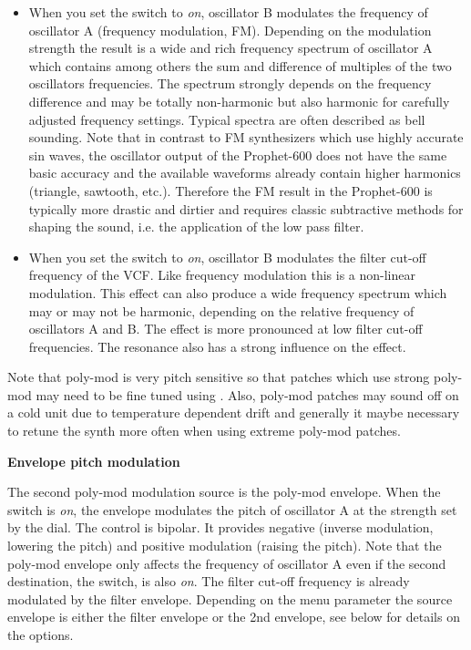 \begin{itemize}
  \item When you set the \polymodfreq switch to \textit{on}, oscillator B modulates the frequency of oscillator A (frequency modulation, FM). Depending on the modulation strength the result is a wide and rich frequency spectrum of oscillator A which contains among others the sum and difference of multiples of the two oscillators frequencies. The spectrum strongly depends on the frequency difference and may be totally non-harmonic but also harmonic for carefully adjusted frequency settings. Typical spectra are often described as bell sounding. Note that in contrast to FM synthesizers which use highly accurate sin waves, the oscillator output of the Prophet-600 does not have the same basic accuracy and the available waveforms already contain higher harmonics (triangle, sawtooth, etc.). Therefore the FM result in the Prophet-600 is typically more drastic and dirtier and requires classic subtractive methods for shaping the sound, i.e. the application of the low pass filter. 
  \item When you set the \polymodfilter switch to \textit{on}, oscillator B modulates the filter cut-off frequency of the VCF. Like frequency modulation this is a non-linear modulation. This effect can also produce a wide frequency spectrum which may or may not be harmonic, depending on the relative frequency of oscillators A and B. The effect is more pronounced at low filter cut-off frequencies. The resonance also has a strong influence on the effect.  
\end{itemize}

Note that poly-mod is very pitch sensitive so that patches which use strong poly-mod may need to be fine tuned using \freqfine. Also, poly-mod patches may sound off on a cold unit due to temperature dependent drift and generally it maybe necessary to retune the synth more often when using extreme poly-mod patches.

\textbf{Envelope pitch modulation}

The second poly-mod modulation source is the poly-mod envelope. When the \polymodfreq switch is \textit{on}, the envelope modulates the pitch of oscillator A at the strength set by the \polymodenv dial. The \polymodenv control is bipolar. It  provides negative (inverse modulation, lowering the pitch) and positive modulation (raising the pitch). Note that the poly-mod envelope only affects the frequency of oscillator A even if the second destination, the \polymodfilter switch, is also \textit{on}. The filter cut-off frequency is already modulated by the filter envelope. Depending on the menu parameter \envrouting the source envelope is either the filter envelope or the 2nd envelope, see below for details on the options.

